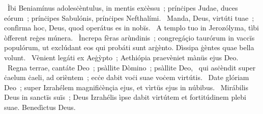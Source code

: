 ~Ìbi Beniamínus adolesċèntulus, in mentis exċèssu~; prínċipes Judae, duces eórum~; prínċipes Sabulónis, prínċipes Nefthalími. 
~Manda, Deus, virtúti tuae~; confìrma hoc, Deus, quod operátus es in nobïs. 
~A templo tuo in Jerozólyma, tìbi òfferent reġes múnera. 
~Ìncrepa fèras arùndinis~; congregáçio taurórum in vaccïs populórum, ut exclúdant eos qui probáti sunt arġènto. Dìssipa ġèntes quae bella volunt. 
~Vènient legáti ex Aeġỳpto~; Aethiópia praevèniet mànüs ejus Deo. 
~Regna terrae, cantáte Deo~; psàllite Dòmino~; psàllite Deo, 
~qui asċèndit super ċaelum ċaeli, ad orièntem~; ecċe dabit voċi suae voċem virtútis. 
~Date glóriam Deo~; super Izrahélem magnifiċènçia ejus, et vìrtüs ejus in núbibus. 
~Mirábilis Deus in sanctïs suïs~; Deus Izrahélis ìpse dabit virtútem et fortitúdinem plebi suae. Benedìctus Deus. 
